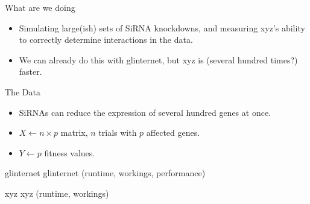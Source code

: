 \begin{frame}{What are we doing}
\begin{itemize}
	\item Simulating large(ish) sets of SiRNA knockdowns, and measuring xyz's ability to correctly determine interactions in the data.
	\item We can already do this with glinternet, but xyz is (several hundred times?) faster.
\end{itemize}
\end{frame}

\begin{frame}{The Data}
\begin{itemize}
	\item SiRNAs can reduce the expression of several hundred genes at once.
	\item $X \leftarrow n \times p$ matrix, $n$ trials with $p$ affected genes.
	\item $Y \leftarrow p$ fitness values.
\end{itemize}
\end{frame}

\begin{frame}{glinternet}
glinternet (runtime, workings, performance)
\end{frame}

\begin{frame}{xyz}
xyz (runtime, workings)
\end{frame}


